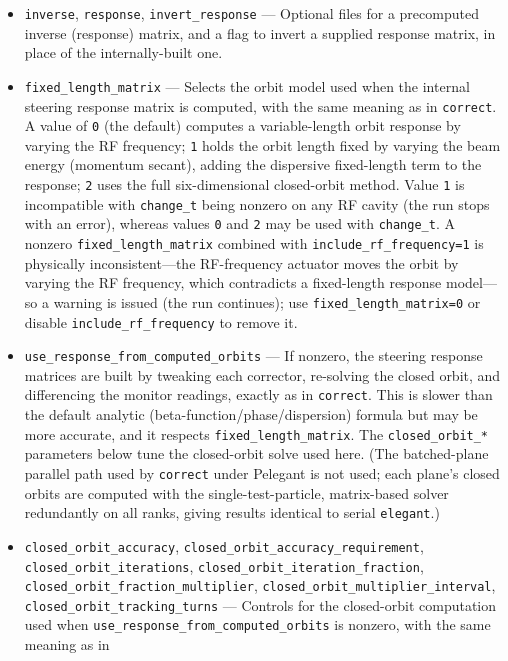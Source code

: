 \documentclass[11pt]{article}
\begin{document}
\begin{itemize}
\item \verb|inverse|, \verb|response|, \verb|invert_response| --- Optional files for a
  precomputed inverse (response) matrix, and a flag to invert a supplied response matrix,
  in place of the internally-built one.
\item \verb|fixed_length_matrix| --- Selects the orbit model used when the internal
  steering response matrix is computed, with the same meaning as in \verb|correct|.  A value
  of \verb|0| (the default) computes a variable-length orbit response by varying the RF
  frequency; \verb|1| holds the orbit length fixed by varying the beam energy (momentum
  secant), adding the dispersive fixed-length term to the response; \verb|2| uses the full
  six-dimensional closed-orbit method.  Value \verb|1| is incompatible with \verb|change_t|
  being nonzero on any RF cavity (the run stops with an error), whereas values \verb|0| and
  \verb|2| may be used with \verb|change_t|.  A nonzero \verb|fixed_length_matrix| combined with
  \verb|include_rf_frequency=1| is physically inconsistent---the RF-frequency actuator moves the
  orbit by varying the RF frequency, which contradicts a fixed-length response model---so a
  warning is issued (the run continues); use \verb|fixed_length_matrix=0| or disable
  \verb|include_rf_frequency| to remove it.
\item \verb|use_response_from_computed_orbits| --- If nonzero, the steering response matrices
  are built by tweaking each corrector, re-solving the closed orbit, and differencing the
  monitor readings, exactly as in \verb|correct|.  This is slower than the default analytic
  (beta-function/phase/dispersion) formula but may be more accurate, and it respects
  \verb|fixed_length_matrix|.  The \verb|closed_orbit_*| parameters below tune the closed-orbit
  solve used here.  (The batched-plane parallel path used by \verb|correct| under Pelegant is
  not used; each plane's closed orbits are computed with the single-test-particle, matrix-based
  solver redundantly on all ranks, giving results identical to serial \verb|elegant|.)
\item \verb|closed_orbit_accuracy|, \verb|closed_orbit_accuracy_requirement|,
  \verb|closed_orbit_iterations|, \verb|closed_orbit_iteration_fraction|,
  \verb|closed_orbit_fraction_multiplier|, \verb|closed_orbit_multiplier_interval|,
  \verb|closed_orbit_tracking_turns| --- Controls for the closed-orbit computation used when
  \verb|use_response_from_computed_orbits| is nonzero, with the same meaning as in

\end{itemize}
\end{document}
